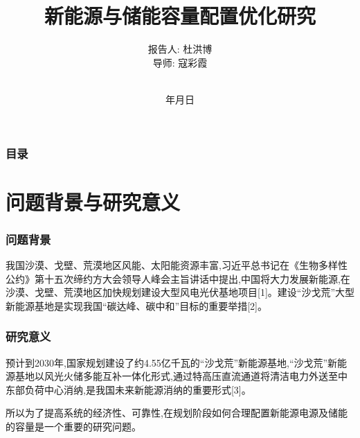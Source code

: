 \documentclass{beamer}
\renewcommand{\today}{\number\year 年\number\month 月\number\day 日}
\begin{document}
\title[新能源与储能容量配置优化研究]%
{新能源与储能容量配置优化研究}


\author[杜洪博]%
{报告人: 杜洪博\\
导\quad 师: 寇彩霞\rule[0pt]{0pt}{20pt}\\}

\institute[BUPT]{\textcolor[rgb]{0.0,0.0,0.10}%
{\small\ttfamily 北京邮电大学\ 理学院\\[10pt]}}

\date{\today}

\begin{frame}[plain]
	\titlepage
\end{frame}

\begin{frame}
	\frametitle{目录}
	\tableofcontents[hideallsubsections] %
\end{frame}

\AtBeginSection[] %
{ \begin{frame}<beamer> %
		\tableofcontents[currentsection,hideallsubsections]%
	\end{frame}
}


\section{问题背景与研究意义}

\begin{frame}
	\frametitle{问题背景} 
	\qquad 我国沙漠、戈壁、荒漠地区风能、太阳能资源丰富,习近平总书记在《生物多样性公约》第十五次缔约方大会领导人峰会主旨讲话中提出,中国将大力发展新能源,在沙漠、戈壁、荒漠地区加快规划建设大型风电光伏基地项目[1]。建设“沙戈荒”大型新能源基地是实现我国“碳达峰、碳中和”目标的重要举措[2]。
\end{frame}

\begin{frame}
	\frametitle{研究意义} 
	\qquad 预计到2030年,国家规划建设了约4.55亿千瓦的“沙戈荒”新能源基地,“沙戈荒”新能源基地以风光火储多能互补一体化形式,通过特高压直流通道将清洁电力外送至中东部负荷中心消纳,是我国未来新能源消纳的重要形式[3]。

	\qquad 所以为了提高系统的经济性、可靠性,在规划阶段如何合理配置新能源电源及储能的容量是一个重要的研究问题。

\end{frame}
\end{document}
